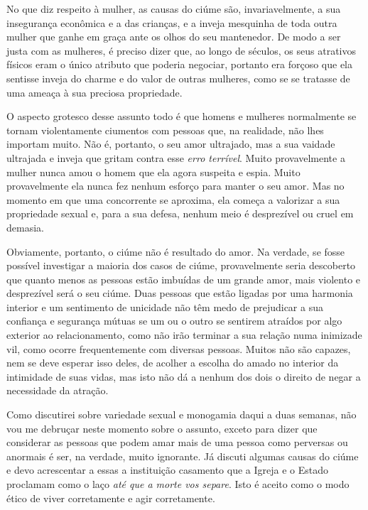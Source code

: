 No que diz respeito à mulher, as causas do ciúme são, invariavelmente, a
sua insegurança econômica e a das crianças, e a inveja mesquinha de toda
outra mulher que ganhe em graça ante os olhos do seu mantenedor. De modo a
ser justa com as mulheres, é preciso dizer que, ao longo de séculos, os seus
atrativos físicos eram o único atributo que poderia negociar, portanto era
forçoso que ela sentisse inveja do charme e do valor de outras mulheres,
como se se tratasse de uma ameaça à sua preciosa propriedade.

O aspecto grotesco desse assunto todo é que homens e mulheres
normalmente se tornam violentamente ciumentos com pessoas que, na
realidade, não lhes importam muito. Não é, portanto, o seu amor\label{ciume}
ultrajado, mas a sua vaidade ultrajada e inveja que gritam contra esse
\textit{erro terrível}. Muito provavelmente a mulher nunca amou o homem que
ela agora suspeita e espia. Muito provavelmente ela nunca fez nenhum
esforço para manter o seu amor. Mas no momento em que uma concorrente se
aproxima, ela começa a valorizar a sua propriedade sexual e, para a sua
defesa, nenhum meio é desprezível ou cruel em demasia.

Obviamente, portanto, o ciúme não é resultado do amor. Na verdade, se
fosse possível investigar a maioria dos casos de ciúme, provavelmente
seria descoberto que quanto menos as pessoas estão imbuídas de um grande
amor, mais violento e desprezível será o seu ciúme. Duas pessoas que
estão ligadas por uma harmonia interior e um sentimento de unicidade não
têm medo de prejudicar a sua confiança e segurança mútuas se um ou o
outro se sentirem atraídos por algo exterior ao relacionamento, como não
irão terminar a sua relação numa inimizade vil, como ocorre
frequentemente com diversas pessoas. Muitos não são capazes, nem se deve
esperar isso deles, de acolher a escolha do amado no interior da
intimidade de suas vidas, mas isto não dá a nenhum dos dois o direito de
negar a necessidade da atração.

Como discutirei sobre variedade sexual e monogamia daqui a duas semanas,
não vou me debruçar neste momento sobre o assunto, exceto para dizer que
considerar as pessoas que podem amar mais de uma pessoa como perversas
ou anormais é ser, na verdade, muito ignorante. Já discuti algumas
causas do ciúme e devo acrescentar a essas a instituição casamento que a
Igreja e o Estado proclamam como o laço \textit{até que a morte vos separe}.
Isto é aceito como o modo ético de viver corretamente e agir
corretamente.

